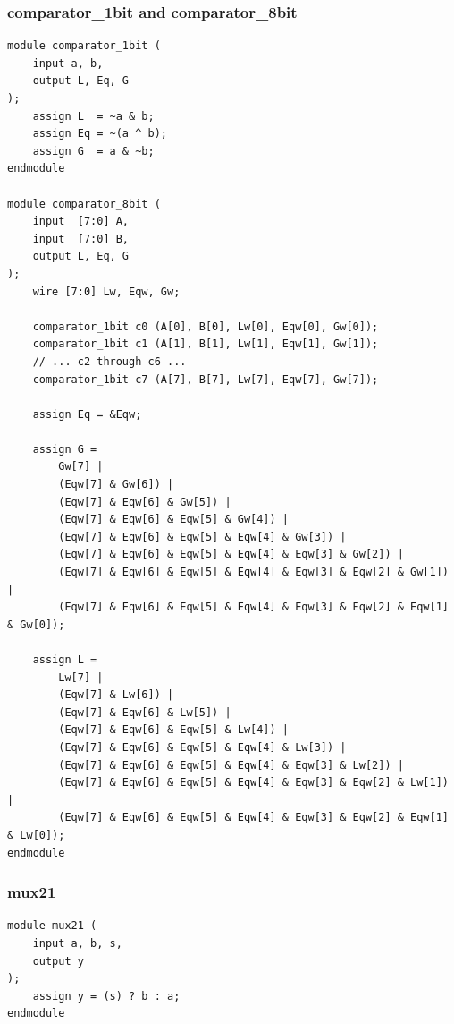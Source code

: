 \documentclass[12pt,a4paper]{article}
\begin{document}
\subsubsection*{comparator\_1bit and comparator\_8bit}
\begin{lstlisting}
module comparator_1bit (
    input a, b,
    output L, Eq, G
);
    assign L  = ~a & b;
    assign Eq = ~(a ^ b);
    assign G  = a & ~b;
endmodule

module comparator_8bit (
    input  [7:0] A,
    input  [7:0] B,
    output L, Eq, G
);
    wire [7:0] Lw, Eqw, Gw;

    comparator_1bit c0 (A[0], B[0], Lw[0], Eqw[0], Gw[0]);
    comparator_1bit c1 (A[1], B[1], Lw[1], Eqw[1], Gw[1]);
    // ... c2 through c6 ...
    comparator_1bit c7 (A[7], B[7], Lw[7], Eqw[7], Gw[7]);

    assign Eq = &Eqw;

    assign G =
        Gw[7] |
        (Eqw[7] & Gw[6]) |
        (Eqw[7] & Eqw[6] & Gw[5]) |
        (Eqw[7] & Eqw[6] & Eqw[5] & Gw[4]) |
        (Eqw[7] & Eqw[6] & Eqw[5] & Eqw[4] & Gw[3]) |
        (Eqw[7] & Eqw[6] & Eqw[5] & Eqw[4] & Eqw[3] & Gw[2]) |
        (Eqw[7] & Eqw[6] & Eqw[5] & Eqw[4] & Eqw[3] & Eqw[2] & Gw[1]) |
        (Eqw[7] & Eqw[6] & Eqw[5] & Eqw[4] & Eqw[3] & Eqw[2] & Eqw[1] & Gw[0]);

    assign L =
        Lw[7] |
        (Eqw[7] & Lw[6]) |
        (Eqw[7] & Eqw[6] & Lw[5]) |
        (Eqw[7] & Eqw[6] & Eqw[5] & Lw[4]) |
        (Eqw[7] & Eqw[6] & Eqw[5] & Eqw[4] & Lw[3]) |
        (Eqw[7] & Eqw[6] & Eqw[5] & Eqw[4] & Eqw[3] & Lw[2]) |
        (Eqw[7] & Eqw[6] & Eqw[5] & Eqw[4] & Eqw[3] & Eqw[2] & Lw[1]) |
        (Eqw[7] & Eqw[6] & Eqw[5] & Eqw[4] & Eqw[3] & Eqw[2] & Eqw[1] & Lw[0]);
endmodule
\end{lstlisting}

\subsubsection*{mux21}
\begin{lstlisting}
module mux21 (
    input a, b, s,
    output y
);
    assign y = (s) ? b : a;
endmodule
\end{lstlisting}
\end{document}
